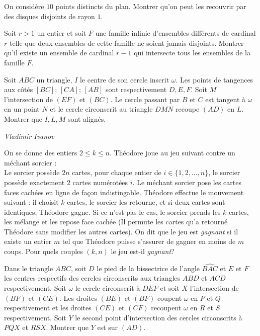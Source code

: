 \begin{exo}{}
On considère $10$ points distincts du plan. Montrer qu'on peut les recouvrir par des disques disjoints de rayon $1$.
\end{exo}

\begin{exo}{}
Soit $r>1$ un entier et soit $F$ une famille infinie d'ensembles différents de cardinal $r$ telle que deux ensembles de cette famille ne soient jamais disjoints. Montrer qu'il existe un ensemble de cardinal $r-1$ qui intersecte tous les ensembles de la famille $F$.
\end{exo}


\begin{exo}{}
Soit $ABC$ un triangle, $I$ le centre de son cercle inscrit $\omega$. Les points de tangences
aux côtés  $[BC]$; $[CA]$; $[AB]$ sont respectivement $D,E, F$. Soit $M$ l’intersection de $(EF)$ et $(BC)$.
Le cercle passant par $B$ et $C$ est tangent à $\omega$ en un point $N$ et le cercle circonscrit au triangle
$DMN$ recoupe $(AD)$ en $L$. Montrer que $I,L,M$ sont alignés.

\medskip
\textit{Vladimir Ivanov}
\end{exo}




\begin{exo}{}
On se donne des entiers $2\le k\le n$. Théodore joue au jeu suivant contre un méchant sorcier : \\
Le sorcier possède $2n$ cartes, pour chaque entier de $i\in \{1,2,...,n\}$, le sorcier possède exactement $2$ cartes numérotées $i$. Le méchant sorcier pose les cartes faces cachées en ligne de façon indistingable. Théodore effectue le mouvement suivant : il choisit $k$ cartes, le sorcier les retourne, et si deux cartes sont identiques, Théodore gagne. Si ce n'est pas le cas, le sorcier prends les $k$ cartes, les mélange et les repose face cachée (Il permute les cartes qu'a retourné Théodore sans modifier les autres cartes). On dit que le jeu est \textit{gagnant} si il existe un entier $m$ tel que Théodore puisse s'assurer de gagner en moins de $m$ coups. Pour quels couples $(k,n)$ le jeu est-il \textit{gagnant}?

\end{exo}

\begin{exo}{}
Dans le triangle $ABC$, soit $D$ le pied de la bissectrice de l'angle $\widehat{BAC}$ et $E$ et $F$ les centres respectifs des cercles circonscrits aux triangles $ABD$ et $ACD$ respectivement. Soit $\omega$ le cercle circonscrit à $DEF$ et soit $X$  l'intersection de $(BF)$ et $(CE)$. Les droites $(BE)$ et $(BF)$ coupent $\omega$ en $P$  et $Q$ respectivement et les droites $(CE)$ et $(CF)$ recoupent $\omega$ en $R$ et $S$ respectivement. Soit $Y$ le second point d'intersection des cercles circonscrits à $PQX$ et $RSX$. Montrer que $Y$ est sur $(AD)$.
\end{exo}


